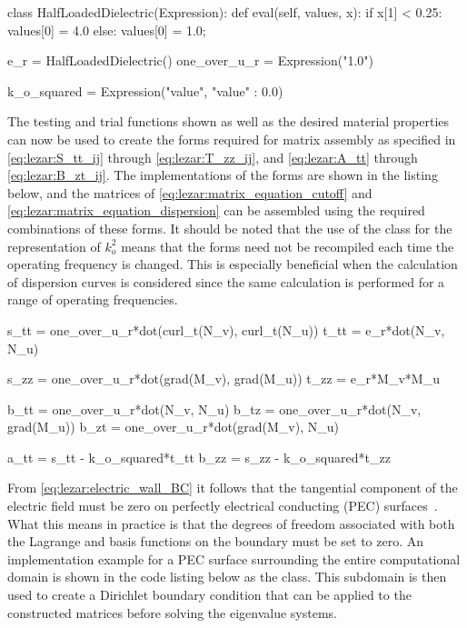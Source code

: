 \begin{python}
class HalfLoadedDielectric(Expression):
    def eval(self, values, x):
        if x[1] < 0.25:
            values[0] = 4.0
        else:
            values[0] = 1.0;

e_r = HalfLoadedDielectric()
one_over_u_r = Expression("1.0")

k_o_squared = Expression("value", {"value" : 0.0})
\end{python}

The testing and trial functions shown as well as the
desired material properties can now be used to create
the forms required for matrix assembly as specified in
\eqref{eq:lezar:S_tt_ij} through \eqref{eq:lezar:T_zz_ij}, and
\eqref{eq:lezar:A_tt} through \eqref{eq:lezar:B_zt_ij}. The
implementations of the forms are shown in the listing below,
and the matrices of \eqref{eq:lezar:matrix_equation_cutoff} and
\eqref{eq:lezar:matrix_equation_dispersion} can be assembled using the
required combinations of these forms. It should be noted that the use of
the  class for the representation of $k_o^2$ means that the forms need
not be recompiled each time the operating frequency is changed. This
is especially beneficial when the calculation of dispersion curves
is considered since the same calculation is performed for a range of
operating frequencies.

\begin{python}
s_tt = one_over_u_r*dot(curl_t(N_v), curl_t(N_u))
t_tt = e_r*dot(N_v, N_u)

s_zz = one_over_u_r*dot(grad(M_v), grad(M_u))
t_zz = e_r*M_v*M_u

b_tt = one_over_u_r*dot(N_v, N_u)
b_tz = one_over_u_r*dot(N_v, grad(M_u))
b_zt = one_over_u_r*dot(grad(M_v), N_u)

a_tt = s_tt - k_o_squared*t_tt
b_zz = s_zz - k_o_squared*t_zz
\end{python}

From \eqref{eq:lezar:electric_wall_BC} it follows that the tangential
component of the electric field must be zero on perfectly electrical
conducting (PEC) surfaces~\citep{Smith1997}. What this means in
practice is that the degrees of freedom associated with both the
Lagrange and \nedelec{} basis functions on the boundary must be set
to zero. An implementation example for a PEC surface surrounding the
entire computational domain is shown in the code listing below as the
 class. This subdomain is then used to create a
Dirichlet boundary condition that can be applied to the constructed
matrices before solving the eigenvalue systems.

